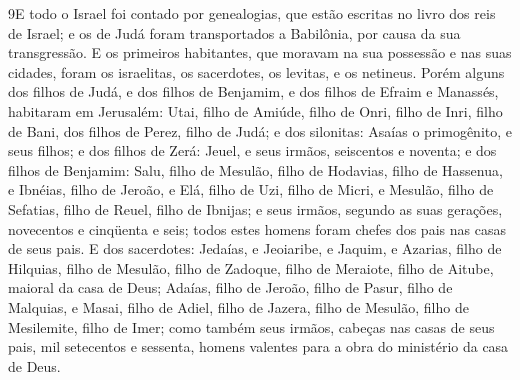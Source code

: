 \medskip

\lettrine{9} E todo o Israel foi contado por genealogias, que
estão escritas no livro dos reis de Israel; e os de Judá foram
transportados a Babilônia, por causa da sua transgressão. E os
primeiros habitantes, que moravam na sua possessão e nas suas
cidades, foram os israelitas, os sacerdotes, os levitas, e os
netineus. Porém alguns dos filhos de Judá, e dos filhos de
Benjamim, e dos filhos de Efraim e Manassés, habitaram em Jerusalém:
Utai, filho de Amiúde, filho de Onri, filho de Inri, filho de
Bani, dos filhos de Perez, filho de Judá; e dos silonitas:
Asaías o primogênito, e seus filhos; e dos filhos de Zerá:
Jeuel, e seus irmãos, seiscentos e noventa; e dos filhos de
Benjamim: Salu, filho de Mesulão, filho de Hodavias, filho de
Hassenua, e Ibnéias, filho de Jeroão, e Elá, filho de Uzi, filho
de Micri, e Mesulão, filho de Sefatias, filho de Reuel, filho de
Ibnijas; e seus irmãos, segundo as suas gerações, novecentos e
cinqüenta e seis; todos estes homens foram chefes dos pais nas casas
de seus pais. E dos sacerdotes: Jedaías, e Jeoiaribe, e
Jaquim, e Azarias, filho de Hilquias, filho de Mesulão, filho
de Zadoque, filho de Meraiote, filho de Aitube, maioral da casa de
Deus; Adaías, filho de Jeroão, filho de Pasur, filho de
Malquias, e Masai, filho de Adiel, filho de Jazera, filho de
Mesulão, filho de Mesilemite, filho de Imer; como também seus
irmãos, cabeças nas casas de seus pais, mil setecentos e sessenta,
homens valentes para a obra do ministério da casa de Deus.

